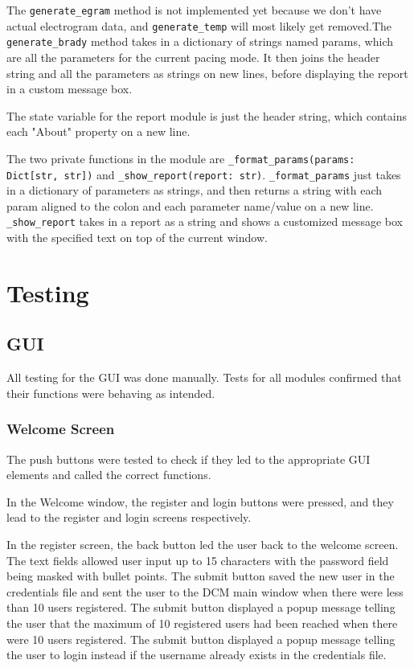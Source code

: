 \documentclass[12pt]{article}
\begin{document}
The \verb|generate_egram| method is not implemented yet because we don't have actual electrogram data, and \verb|generate_temp| will most likely get removed.The \verb|generate_brady| method takes in a dictionary of strings named params, which are all the parameters for the current pacing mode. It then joins the header string and all the parameters as strings on new lines, before displaying the report in a custom message box.

The state variable for the report module is just the header string, which contains each "About" property on a new line.

The two private functions in the module are \verb|_format_params(params: Dict[str, str])| and \verb|_show_report(report: str)|. \verb|_format_params| just takes in a dictionary of parameters as strings, and then returns a string with each param aligned to the colon and each parameter name/value on a new line. \verb|_show_report| takes in a report as a string and shows a customized message box with the specified text on top of the current window.

\newpage
\section{Testing}
\subsection{GUI}
All testing for the GUI was done manually. Tests for all modules confirmed that their functions were behaving as intended.

\subsubsection{Welcome Screen}\label{Testing:WelcomeScreen}
The push buttons were tested to check if they led to the appropriate GUI elements and called the correct functions.

In the Welcome window, the register and login buttons were pressed, and they lead to the register and login screens respectively.

In the register screen, the back button led the user back to the welcome screen. The text fields allowed user input up to 15 characters with the password field being masked with bullet points. The submit button saved the new user in the credentials file and sent the user to the DCM main window when there were less than 10 users registered. The submit button displayed a popup message telling the user that the maximum of 10 registered users had been reached when there were 10 users registered. The submit button displayed a popup message telling the user to login instead if the username already exists in the credentials file.
\end{document}
